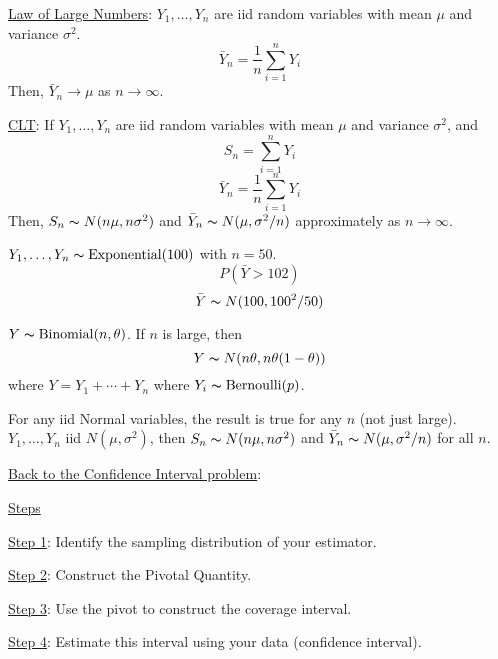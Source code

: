 \underline{Law of Large Numbers}: $ Y_1,\ldots ,Y_n $ are iid random
variables with mean $ \mu $ and variance $ \sigma^2 $.
\[ \bar{Y}_n=\frac{1}{n} \sum\limits_{i=1}^{n} Y_i \]
Then, $ \bar{Y}_n\to \mu $ as $ n\to \infty $.

\underline{CLT}: If $ Y_1,\ldots ,Y_n $ are iid random variables
with mean $ \mu $ and variance $ \sigma^2 $, and
\[ S_n=\sum\limits_{i=1}^{n} Y_i \]
\[ \bar{Y}_n=\frac{1}{n} \sum\limits_{i=1}^{n} Y_i \]
Then, $ S_n \thicksim N(n\mu,n\sigma^2) $ and $ \bar{Y}_n
    \thicksim N(\mu,\sigma^2/n) $ approximately as $ n\to \infty $.
\begin{exbox}
    \begin{example}
        $ Y_1,\ldots ,Y_n \thicksim \operatorname{Exponential}(100) $ with $ n=50 $.
        \[ P\left(\bar{Y}>102\right) \]
        \[ \bar{Y} \thicksim N(100,100^2/50) \]
    \end{example}
\end{exbox}
\begin{exbox}
    \begin{example}
        $ Y \thicksim \operatorname{Binomial}(n,\theta) $. If $ n $ is large, then
        \[ Y \thicksim N(n\theta,n\theta(1-\theta)) \]
        where $ Y=Y_1+\cdots+Y_n $ where $ Y_i \thicksim \text{Bernoulli}(p) $.
    \end{example}
\end{exbox}
\begin{exbox}
    \begin{example}
        For any iid Normal variables, the result is true for any $ n $ (not just large).
        $ Y_1,\ldots ,Y_n $ iid $ N(\mu,\sigma^2) $, then $ S_n \thicksim N(n\mu,n\sigma^2) $
        and $ \bar{Y}_n \thicksim N(\mu,\sigma^2/n) $ for all $ n $.
    \end{example}
\end{exbox}
\underline{Back to the Confidence Interval problem}:

\underline{Steps}

\underline{Step 1}: Identify the sampling distribution of your estimator.

\underline{Step 2}: Construct the Pivotal Quantity.

\underline{Step 3}: Use the pivot to construct the coverage interval.

\underline{Step 4}: Estimate this interval using your data (confidence interval).

